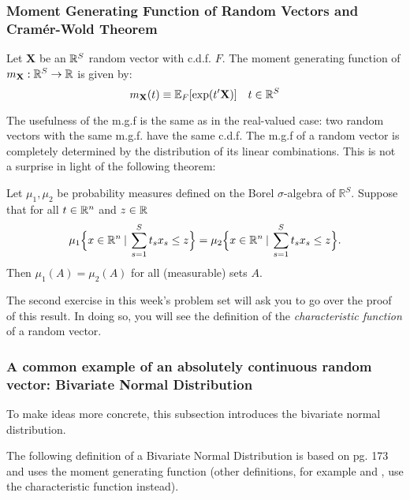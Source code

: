 \documentclass[11pt]{article} %
\begin{document}
\newpage

\subsubsection{Moment Generating Function of Random Vectors and Cram\'er-Wold Theorem}

\begin{definition}  Let $\mathbf{X}$ be an $\mathbb{R}^S$ random vector with c.d.f. $F$. The moment generating function of $m_{\mathbf{X}}: \mathbb{R}^{S} \rightarrow \mathbb{R}$ is given by:
$$m_{\mathbf{X}}(t) \equiv \mathbb{E}_{F}[\exp(t'\mathbf{X})] \quad t \in \mathbb{R}^{S}  $$
\end{definition}

The usefulness of the m.g.f is the same as in the real-valued case:  two random vectors with the same m.g.f. have the same c.d.f. The m.g.f of a random vector is completely determined by the distribution of its linear combinations. This is not a surprise in light of the following theorem:

\begin{theorem}
Let $\mu_1, \mu_2$ be probability measures defined on the Borel $\sigma$-algebra of $\mathbb{R}^S$. Suppose that for all $t \in \mathbb{R}^n$ and $z \in \mathbb{R}$
$$\mu_1 \Big\{x \in \mathbb{R}^n \: | \: \sum_{s=1}^{S} t_s x_s \leq z \Big\} = \mu_2 \Big\{x \in \mathbb{R}^n \: | \: \sum_{s=1}^{S} t_s x_s  \leq z \Big\}.$$
\noindent Then $\mu_1(A)=\mu_2(A)$ for all (measurable) sets $A$.
\end{theorem}

\begin{prproblem} 
The second exercise in this week's problem set will ask you to go over the proof of this result. In doing so, you will see the definition of the \emph{characteristic function} of a random vector. 
\end{prproblem}

\newpage

\subsubsection{A common example of an absolutely continuous random vector: Bivariate Normal Distribution}
To make ideas more concrete, this subsection introduces the bivariate normal distribution. 


The following definition of a Bivariate Normal Distribution is based on \cite{hogg} pg. 173 and uses the moment generating function (other definitions, for example \cite{Billingsley95} and \cite{durrett2010}, use the characteristic function instead).\\  
\end{document}
